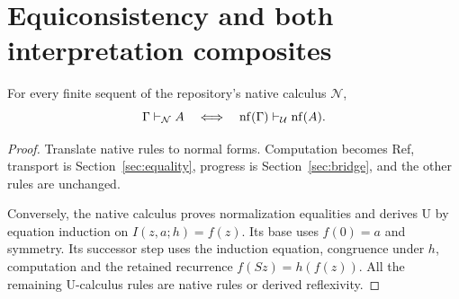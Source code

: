 \section{Equiconsistency and both interpretation composites}
\begin{theorem}
For every finite sequent of the repository's native calculus $\mathcal N$,
\[
 \Gamma\vdash_{\mathcal N}A
 \quad\Longleftrightarrow\quad
 \operatorname{nf}(\Gamma)\vdash_{\mathcal U}\operatorname{nf}(A).
\]
\end{theorem}
\begin{proof}
Translate native rules to normal forms. Computation becomes Ref,
transport is Section~\ref{sec:equality}, progress is
Section~\ref{sec:bridge}, and the other rules are unchanged.

Conversely, the native calculus proves normalization equalities and
derives U by equation induction on $I(z,a;h)=f(z)$.
Its base uses $f(0)=a$ and symmetry. Its successor step uses the
induction equation, congruence under $h$, computation and the retained
recurrence $f(Sz)=h(f(z))$. All the remaining U-calculus rules are native
rules or derived reflexivity.
\end{proof}

